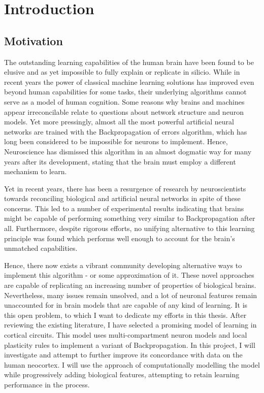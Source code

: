 
\chapter{Introduction}



\section{Motivation}

The outstanding learning capabilities of the human brain have been found to be elusive and as yet impossible to fully
explain or replicate in silicio. While in recent years the power of classical machine learning solutions  has improved
even beyond human capabilities for some tasks, their underlying algorithms cannot serve as a model of human cognition.
Some reasons why brains and machines appear irreconcilable relate to questions about network structure and neuron
models. Yet more pressingly, almost all the most powerful artificial neural networks are trained with the
Backpropagation of errors algorithm, which has long been considered to be impossible for neurons to implement. Hence,
Neuroscience has dismissed this algorithm in an almost dogmatic way for many years after its development, stating that
the brain must employ a different mechanism to learn.

Yet in recent years, there has been a resurgence of research by neuroscientists towards reconciling biological and
artificial neural networks in spite of these concerns. This led to a number of experimental results indicating that
brains might be capable of performing something very similar to Backpropagation after all. Furthermore, despite rigorous
efforts, no unifying alternative to this learning principle was found which performs well enough to account for the
brain's unmatched capabilities.

Hence, there now exists a vibrant community developing alternative ways to implement this algorithm - or some
approximation of it. These novel approaches are capable of replicating an increasing number of properties of biological
brains. Nevertheless, many issues remain unsolved, and a lot of neuronal features remain unaccounted for in brain models
that are capable of any kind of learning. It is this open problem, to which I want to dedicate my efforts in this
thesis. After reviewing the existing literature, I have selected a promising model of learning in cortical circuits.
This model uses multi-compartment neuron models and local plasticity rules to implement a variant of Backpropagation. In
this project, I will investigate and attempt to further improve its concordance with data on the human neocortex. I will
use the approach of computationally modelling the model while progressively adding biological features, attempting to
retain learning performance in the process.


